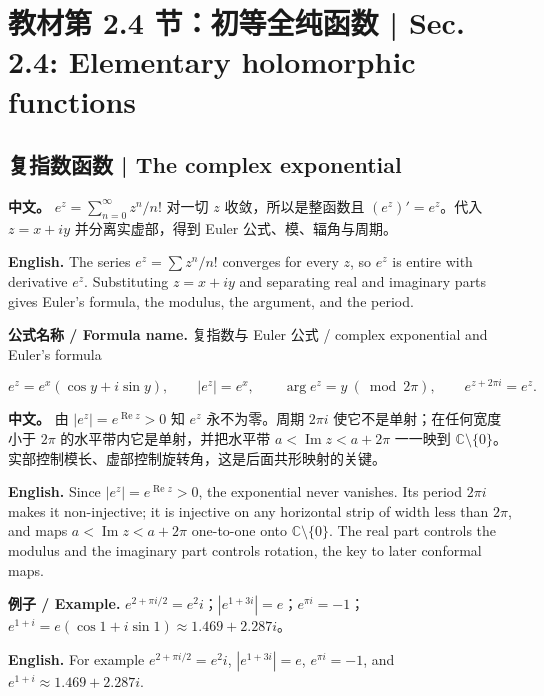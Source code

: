\documentclass[UTF8,11pt,a4paper]{ctexart}
\newcommand{\EN}[1]{\par\noindent \textbf{English.} #1\par}
\newcommand{\FORMULA}[2]{\par\noindent\textbf{公式名称 / Formula name.} #1 / #2\par}
\newcommand{\EX}[2]{\par\noindent \textbf{例子 / Example.} #1\par\EN{#2}}
\newcommand{\APS}[2]{\par\noindent\textbf{中文。} #1\par\noindent\textbf{English.} #2\par\smallskip}
\begin{document}
\section[教材第 2 章 初等函数]{教材第 2.4 节：初等全纯函数 | Sec. 2.4: Elementary holomorphic functions}

\subsection{复指数函数 | The complex exponential}
\APS{$e^z=\sum_{n=0}^{\infty}z^n/n!$ 对一切 $z$ 收敛，所以是整函数且 $(e^z)'=e^z$。代入 $z=x+iy$ 并分离实虚部，得到 Euler 公式、模、辐角与周期。}{The series $e^z=\sum z^n/n!$ converges for every $z$, so $e^z$ is entire with derivative $e^z$. Substituting $z=x+iy$ and separating real and imaginary parts gives Euler's formula, the modulus, the argument, and the period.}
\FORMULA{复指数与 Euler 公式}{complex exponential and Euler's formula}
\[
e^z=e^x(\cos y+i\sin y),\qquad |e^z|=e^x,\qquad
\arg e^z=y\ (\!\!\!\bmod 2\pi),\qquad e^{z+2\pi i}=e^z.
\]
\APS{由 $|e^z|=e^{\operatorname{Re}z}>0$ 知 $e^z$ 永不为零。周期 $2\pi i$ 使它不是单射；在任何宽度小于 $2\pi$ 的水平带内它是单射，并把水平带 $a<\operatorname{Im}z<a+2\pi$ 一一映到 $\mathbb C\setminus\{0\}$。实部控制模长、虚部控制旋转角，这是后面共形映射的关键。}{Since $|e^z|=e^{\operatorname{Re}z}>0$, the exponential never vanishes. Its period $2\pi i$ makes it non-injective; it is injective on any horizontal strip of width less than $2\pi$, and maps $a<\operatorname{Im}z<a+2\pi$ one-to-one onto $\mathbb C\setminus\{0\}$. The real part controls the modulus and the imaginary part controls rotation, the key to later conformal maps.}
\EX{$e^{2+\pi i/2}=e^2i$；$|e^{1+3i}|=e$；$e^{\pi i}=-1$；$e^{1+i}=e(\cos1+i\sin1)\approx1.469+2.287i$。}{For example $e^{2+\pi i/2}=e^2i$, $|e^{1+3i}|=e$, $e^{\pi i}=-1$, and $e^{1+i}\approx1.469+2.287i$.}
\end{document}
